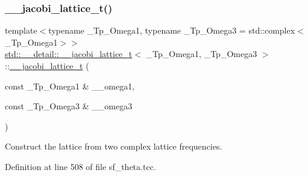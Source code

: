 \subsubsection{\texorpdfstring{\+\_\+\+\_\+jacobi\+\_\+lattice\+\_\+t()}{\_\_jacobi\_lattice\_t()}\hspace{0.1cm}{\footnotesize\ttfamily [1/3]}}
{\footnotesize\ttfamily template$<$typename \+\_\+\+Tp\+\_\+\+Omega1, typename \+\_\+\+Tp\+\_\+\+Omega3 = std\+::complex$<$\+\_\+\+Tp\+\_\+\+Omega1$>$$>$ \\
\hyperlink{structstd_1_1____detail_1_1____jacobi__lattice__t}{std\+::\+\_\+\+\_\+detail\+::\+\_\+\+\_\+jacobi\+\_\+lattice\+\_\+t}$<$ \+\_\+\+Tp\+\_\+\+Omega1, \+\_\+\+Tp\+\_\+\+Omega3 $>$\+::\hyperlink{structstd_1_1____detail_1_1____jacobi__lattice__t}{\+\_\+\+\_\+jacobi\+\_\+lattice\+\_\+t} (\begin{DoxyParamCaption}\item[{const \+\_\+\+Tp\+\_\+\+Omega1 \&}]{\+\_\+\+\_\+omega1,  }\item[{const \+\_\+\+Tp\+\_\+\+Omega3 \&}]{\+\_\+\+\_\+omega3 }\end{DoxyParamCaption})\hspace{0.3cm}{\ttfamily [inline]}}



Construct the lattice from two complex lattice frequencies. 



Definition at line 508 of file sf\+\_\+theta.\+tcc.

\mbox{\label{structstd_1_1____detail_1_1____jacobi__lattice__t_a057b7fa65a9046eee377801fc518ed80}} 
